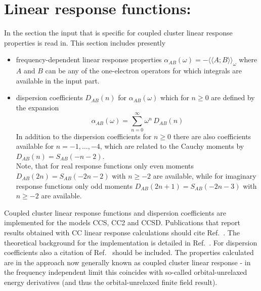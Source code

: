 
\section{Linear response functions: }\label{sec:cclr}

In the  section the input that is
specific for coupled cluster linear response properties is read in. 
This section includes presently 
\begin{itemize}
\item frequency-dependent linear response properties 
      $\alpha_{AB}(\omega)  = - \langle\langle A; B \rangle\rangle_\omega$
      where $A$ and $B$ can be any of the one-electron
      operators for which integrals are available in the 
       input part.
\item dispersion coefficients $D_{AB}(n)$ for $\alpha_{AB}(\omega)$
      which for $n \ge 0$ are defined by the expansion
      $$ \alpha_{AB}(\omega) = \sum_{n=0}^{\infty} \omega^n \, D_{AB}(n) $$
      In addition to the dispersion coefficients for $n \ge 0$
      there are also coefficients available for $ n = -1, \ldots, -4$,
      which are related to the Cauchy moments
       by $ D_{AB}(n) = S_{AB}(-n-2)$.
      \\
      Note, that for real response functions only even moments
      $D_{AB}(2n) = S_{AB}(-2n-2)$ with $n \ge -2$ are available,
      while for imaginary response functions only odd moments
      $D_{AB}(2n+1) = S_{AB}(-2n-3)$ with $n \ge -2$ are available.
\end{itemize}
Coupled cluster linear response functions and dispersion coefficients
are implemented for the models CCS, CC2 and CCSD. 
Publications that report results obtained with CC linear response
calculations should cite Ref.\ \cite{Christiansen:CCLR}. 
The theoretical background for the implementation is detailed in Ref.\ \cite{Christiansen:QEL}.
For dispersion coefficients also a citation of Ref.\ \cite{Haettig:CAUCHY} 
should be included.
The properties calculated are in the approach now generally known as coupled cluster 
linear response - in the frequency independent limit this coincides with so-called 
orbital-unrelaxed energy derivatives (and thus the orbital-unrelaxed finite field result).

